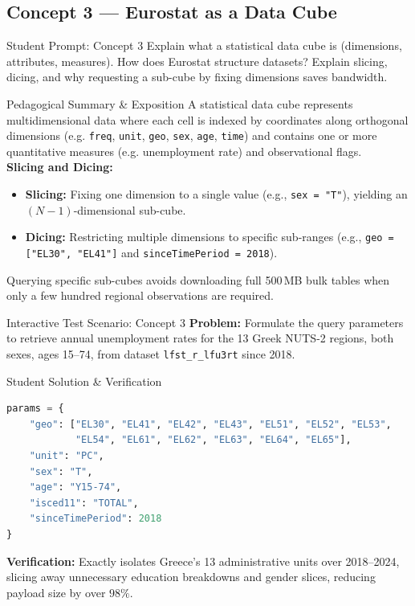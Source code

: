 \documentclass[11pt,a4paper]{article}
\begin{document}
\subsection{Concept 3 --- Eurostat as a Data Cube}
\begin{promptbox}{Student Prompt: Concept 3}
Explain what a statistical data cube is (dimensions, attributes, measures). How does Eurostat structure datasets? Explain slicing, dicing, and why requesting a sub-cube by fixing dimensions saves bandwidth.
\end{promptbox}

\begin{evalbox}{Pedagogical Summary \& Exposition}
A statistical data cube represents multidimensional data where each cell is indexed by coordinates along orthogonal dimensions (e.g. \texttt{freq}, \texttt{unit}, \texttt{geo}, \texttt{sex}, \texttt{age}, \texttt{time}) and contains one or more quantitative measures (e.g. unemployment rate) and observational flags.\\
\textbf{Slicing and Dicing:}
\begin{itemize}
    \item \textbf{Slicing:} Fixing one dimension to a single value (e.g., \texttt{sex = "T"}), yielding an $(N-1)$-dimensional sub-cube.
    \item \textbf{Dicing:} Restricting multiple dimensions to specific sub-ranges (e.g., \texttt{geo = ["EL30", "EL41"]} and \texttt{sinceTimePeriod = 2018}).
\end{itemize}
Querying specific sub-cubes avoids downloading full 500\,MB bulk tables when only a few hundred regional observations are required.
\end{evalbox}

\begin{testbox}{Interactive Test Scenario: Concept 3}
\textbf{Problem:} Formulate the query parameters to retrieve annual unemployment rates for the 13 Greek NUTS-2 regions, both sexes, ages 15--74, from dataset \texttt{lfst\_r\_lfu3rt} since 2018.
\end{testbox}

\begin{evalbox}{Student Solution \& Verification}
\begin{lstlisting}[language=Python]
params = {
    "geo": ["EL30", "EL41", "EL42", "EL43", "EL51", "EL52", "EL53", 
            "EL54", "EL61", "EL62", "EL63", "EL64", "EL65"],
    "unit": "PC",
    "sex": "T",
    "age": "Y15-74",
    "isced11": "TOTAL",
    "sinceTimePeriod": 2018
}
\end{lstlisting}
\textbf{Verification:} Exactly isolates Greece's 13 administrative units over 2018--2024, slicing away unnecessary education breakdowns and gender slices, reducing payload size by over $98\%$.
\end{evalbox}
\end{document}
